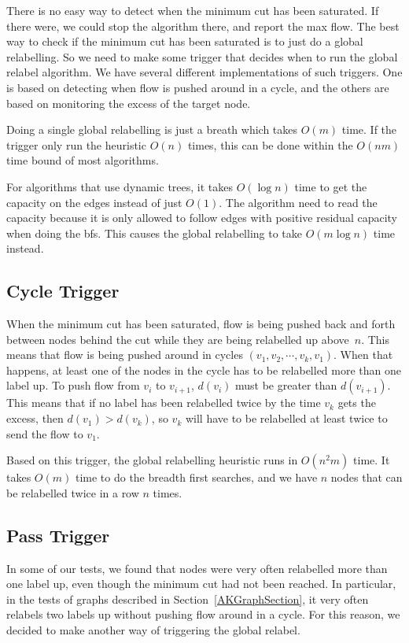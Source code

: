 There is no easy way to detect when the minimum cut has been saturated. If there were, we could stop the algorithm there, and report the max flow.
The best way to check if the minimum cut has been saturated is to just do a global relabelling. So we need to make some trigger that decides when to run the global relabel algorithm.
We have several different implementations of such triggers. One is based on detecting when flow is pushed around in a cycle, and the others are based on monitoring the excess of the target node.

Doing a single global relabelling is just a breath which takes $O(m)$ time.
If the trigger only run the heuristic $O(n)$ times, this can be done within the $O(nm)$ time bound of most algorithms.

For algorithms that use dynamic trees, it takes $O(\log n)$ time to get the capacity on the edges instead of just $O(1)$.
The algorithm need to read the capacity because it is only allowed to follow edges with positive residual capacity when doing the bfs.
This causes the global relabelling to take $O(m\log n)$ time instead.

\subsection{Cycle Trigger}

When the minimum cut has been saturated, flow is being pushed back and forth between nodes behind the cut while they are being relabelled up above~$n$.
This means that flow is being pushed around in cycles  $(v_1, v_2, \cdots, v_k, v_1)$. 
When that happens, at least one of the nodes in the cycle has to be relabelled more than one label up.
To push flow from $v_i$ to $v_{i+1}$, $d(v_i)$ must be greater than $d(v_{i+1})$. 
This means that if no label has been relabelled twice by the time $v_k$ gets the excess, then $d(v_1) > d(v_k)$, so $v_k$ will have to be relabelled at least twice to send the flow to $v_1$.

Based on this trigger, the global relabelling heuristic runs in $O(n^2m)$ time. 
It takes $O(m)$ time to do the breadth first searches, and we have $n$ nodes that can be relabelled twice in a row $n$ times.

\subsection{Pass Trigger}
In some of our tests, we found that nodes were very often relabelled more than one label up, even though the minimum cut had not been reached. 
In particular, in the tests of graphs described in Section~\ref{AKGraphSection}, it very often relabels two labels up without pushing flow around in a cycle.
For this reason, we decided to make another way of triggering the global relabel.

